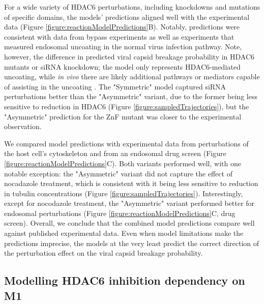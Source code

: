 For a wide variety of HDAC6 perturbations, including knockdowns and mutations of specific domains, the models’ predictions aligned well with the experimental data (Figure \ref{figure:reactionModelPredictions}B). Notably, predictions were consistent with data from bypass experiments as well as experiments that measured endosomal uncoating in the normal virus infection pathway. Note, however, the difference in predicted viral capsid breakage probability in HDAC6 mutants or siRNA knockdown; the model only represents HDAC6-mediated uncoating, while \textit{in vivo} there are likely additional pathways or mediators capable of assisting in the uncoating \cite{gschweitl2016spopl,huotari2012cullin,miyake2019influenza,su2013pooled,yanguez2018phosphoproteomic}. The "Symmetric" model captured siRNA perturbations better than the "Asymmetric" variant, due to the former being less sensitive to reduction in HDAC6 (Figure \ref{figure:sampledTrajectories}), but the "Asymmetric" prediction for the ZnF mutant was closer to the experimental observation.

We compared model predictions with experimental data from perturbations of the host cell’s cytoskeleton and from an endosomal drug screen \cite{banerjee2014influenza} (Figure \ref{figure:reactionModelPredictions}C). Both variants performed well, with one notable exception: the "Asymmetric" variant did not capture the effect of nocadazole treatment, which is consistent with it being less sensitive to reduction in tubulin concentrations (Figure \ref{figure:sampledTrajectories}). Interestingly, except for nocodazole treatment, the "Asymmetric" variant performed better for endosomal perturbations (Figure \ref{figure:reactionModelPredictions}C, drug screen). Overall, we conclude that the combined model predictions compare well against published experimental data. Even when model limitations make the predictions imprecise, the models at the very least predict the correct direction of the perturbation effect on the viral capsid breakage probability. 

\subsection{Modelling HDAC6 inhibition dependency on M1}

